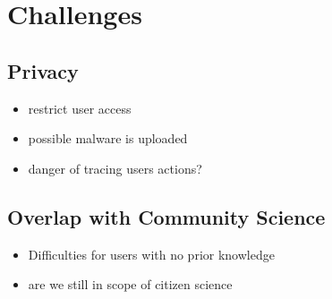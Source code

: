 \chapter{Challenges}\label{ch:challenges} %
\section{Privacy}
\begin{itemize}
    \item restrict user access
    \item possible malware is uploaded
    \item danger of tracing users actions?
\end{itemize}

\section{Overlap with Community Science}
\begin{itemize}
    \item Difficulties for users with no prior knowledge
    \item are we still in scope of citizen science
\end{itemize}
